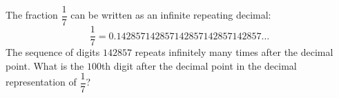 The fraction $\dfrac{1}{7}$ can be written as an infinite repeating decimal: \[\dfrac{1}{7}=0.142857142857142857142857142857\ldots\]The sequence of digits $142857$ repeats infinitely many times after the decimal point. What is the $100$th digit after the decimal point in the decimal representation of $\dfrac{1}{7}$?
